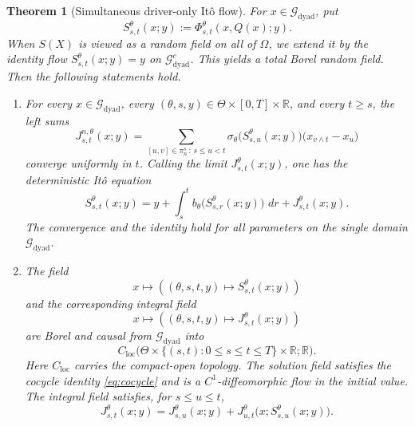 \documentclass[10pt,a4paper]{amsart}
\newtheorem{theorem}{Theorem}
\newcommand{\R}{\mathbb R}
\newcommand{\cG}{\mathcal G}
\newcommand{\dd}{\,d}
\begin{document}
\begin{theorem}[Simultaneous driver-only It\^o flow]
\label{thm:simultaneous-flow}
For \(x\in\cG_{\mathrm{dyad}}\), put
\begin{equation}\label{eq:driver-flow}
  S_{s,t}^\theta(x;y)
  :=\Phi_{s,t}^\theta(x,Q(x);y).
\end{equation}
When \(S(X)\) is viewed as a random field on all of \(\Omega\), we extend it
by the identity flow \(S_{s,t}^\theta(x;y)=y\) on
\(\cG_{\mathrm{dyad}}^c\).  This yields a total Borel random field.
Then the following statements hold.

\begin{enumerate}[label=(\roman*),leftmargin=2.2em]
  \item For every \(x\in\cG_{\mathrm{dyad}}\), every
  \((\theta,s,y)\in\Theta\times[0,T]\times\R\), and every \(t\ge s\),
  the left sums
  \begin{equation}\label{eq:Follmer-sums}
    J_{s,t}^{n,\theta}(x;y)
    =
    \sum_{[u,v]\in\pi_n^s\,:\,s\le u<t}
    \sigma_\theta\bigl(S_{s,u}^\theta(x;y)\bigr)
    \bigl(x_{v\wedge t}-x_u\bigr)
  \end{equation}
  converge uniformly in \(t\).  Calling the limit
  \(J_{s,t}^\theta(x;y)\), one has the deterministic It\^o equation
  \begin{equation}\label{eq:pathwise-sde-flow}
    S_{s,t}^\theta(x;y)
    =y+
    \int_s^t b_\theta\bigl(S_{s,r}^\theta(x;y)\bigr)\,\dd r
    +J_{s,t}^\theta(x;y).
  \end{equation}
  The convergence and the identity hold for all parameters on the single
  domain \(\cG_{\mathrm{dyad}}\).

  \item The field
  \begin{equation}\label{eq:flow-valued-map}
    x\longmapsto
    \left(
      (\theta,s,t,y)\longmapsto S_{s,t}^\theta(x;y)
    \right)
  \end{equation}
  and the corresponding integral field
  \[
    x\longmapsto
    \left(
      (\theta,s,t,y)\longmapsto J_{s,t}^\theta(x;y)
    \right)
  \]
  are Borel and causal from \(\cG_{\mathrm{dyad}}\) into
  \[
    C_{\mathrm{loc}}
    \bigl(\Theta\times\{(s,t):0\le s\le t\le T\}\times\R;\R\bigr).
  \]
  Here \(C_{\mathrm{loc}}\) carries the compact-open topology.
  The solution field satisfies the cocycle identity \eqref{eq:cocycle} and is a
  \(C^1\)-diffeomorphic flow in the initial value.  The integral field
  satisfies, for \(s\le u\le t\),
  \begin{equation}\label{eq:integral-cocycle}
    J_{s,t}^\theta(x;y)
    =J_{s,u}^\theta(x;y)
     +J_{u,t}^\theta
       \bigl(x;S_{s,u}^\theta(x;y)\bigr).
  \end{equation}


\end{enumerate}
\end{theorem}
\end{document}
